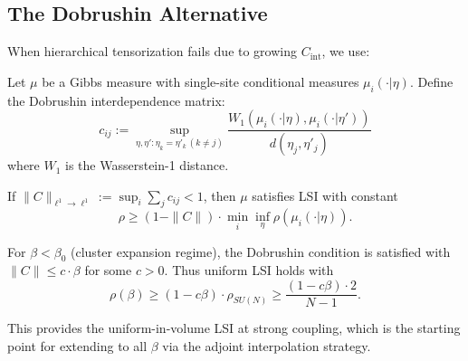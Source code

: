 \subsection{The Dobrushin Alternative}

When hierarchical tensorization fails due to growing $C_{\mathrm{int}}$, we use:

\begin{theorem}\label{thm:dobrushin-lsi}
Let $\mu$ be a Gibbs measure with single-site conditional measures $\mu_i(\cdot | \eta)$. Define the Dobrushin interdependence matrix:
\begin{equation}
    c_{ij} := \sup_{\eta, \eta': \eta_k = \eta'_k \, (k \neq j)} \frac{W_1(\mu_i(\cdot|\eta), \mu_i(\cdot|\eta'))}{d(\eta_j, \eta'_j)}
\end{equation}
where $W_1$ is the Wasserstein-1 distance.

If $\|C\|_{\ell^1 \to \ell^1} := \sup_i \sum_j c_{ij} < 1$, then $\mu$ satisfies LSI with constant
\begin{equation}
    \rho \geq (1 - \|C\|) \cdot \min_i \inf_\eta \rho(\mu_i(\cdot|\eta)).
\end{equation}
\end{theorem}

\begin{corollary}
For $\beta < \beta_0$ (cluster expansion regime), the Dobrushin condition is satisfied with $\|C\| \leq c \cdot \beta$ for some $c > 0$. Thus uniform LSI holds with
\begin{equation}
    \rho(\beta) \geq (1 - c\beta) \cdot \rho_{SU(N)} \geq \frac{(1 - c\beta) \cdot 2}{N-1}.
\end{equation}
\end{corollary}

This provides the uniform-in-volume LSI at strong coupling, which is the starting point for extending to all $\beta$ via the adjoint interpolation strategy.



